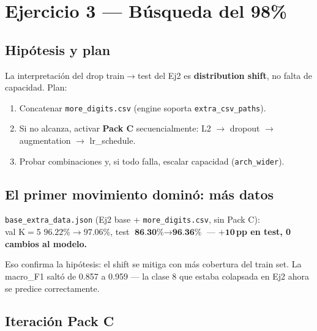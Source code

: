 \documentclass[11pt,a4paper]{article}
\newcommand{\code}[1]{\texttt{\textcolor{accent}{#1}}}
\begin{document}
\section{Ejercicio 3 — Búsqueda del 98\%}\label{sec:ej3}

\subsection{Hipótesis y plan}
La interpretación del drop train\(\to\)test del Ej2 es \textbf{distribution shift}, no falta de capacidad. Plan:
\begin{enumerate}[leftmargin=1.4em, itemsep=2pt]
  \item Concatenar \code{more\_digits.csv} (engine soporta \code{extra\_csv\_paths}).
  \item Si no alcanza, activar \textbf{Pack C} secuencialmente: L2 \(\to\) dropout \(\to\) augmentation \(\to\) lr\_schedule.
  \item Probar combinaciones y, si todo falla, escalar capacidad (\code{arch\_wider}).
\end{enumerate}

\subsection{El primer movimiento dominó: más datos}

\begin{takeaway}
\code{base\_extra\_data.json} (Ej2 base + \code{more\_digits.csv}, sin Pack C):\\
val K$=$5 \(96.22\% \to 97.06\%\), test \(\textbf{86.30\%} \to \textbf{96.36\%}\) — \(\boldsymbol{+10}\)\,\textbf{pp en test, 0 cambios al modelo.}
\end{takeaway}

\noindent Eso confirma la hipótesis: el shift se mitiga con más cobertura del train set. La macro\_F1 saltó de 0.857 a 0.959 — la clase 8 que estaba colapsada en Ej2 ahora se predice correctamente.

\subsection{Iteración Pack C}
\end{document}
